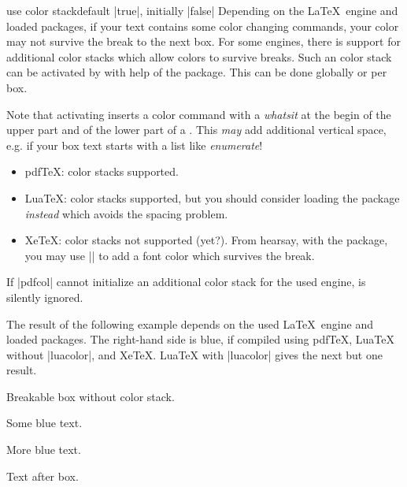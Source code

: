\begin{docTcbKey}[][doc new=2020-10-09]{use color stack}{}{default |true|, initially |false|}
  Depending on the \LaTeX\ engine and loaded packages, if your text contains some
  color changing commands, your color may not survive the break to the next box.
  For some engines, there is support for additional color stacks which
  allow colors to survive breaks. Such an color stack  can be activated
  by  with help of the  package.
  This can be done globally or per box.
  \begin{marker}
  Note that activating  inserts a color command with a \emph{whatsit}
  at the begin of the upper part and of the lower part of a .
  This \emph{may} add additional vertical space, e.g. if your box text starts
  with a list like \emph{enumerate}!
  \end{marker}
  \begin{itemize}
  \item pdf\TeX: color stacks supported.
  \item Lua\TeX: color stacks supported, but you should consider loading the
      package \emph{instead} which avoids the spacing problem.
  \item Xe\TeX: color stacks not supported (yet?). From hearsay,
    with the  package, you may use ||
    to add a font color which survives the break.
  \end{itemize}
  If |pdfcol| cannot initialize an additional color stack for the used engine,
   is silently ignored.

\clearpage
The result of the following example depends on the used  \LaTeX\ engine and
loaded packages. The right-hand side is blue, if compiled using
pdf\TeX, Lua\TeX{} without |luacolor|, and  Xe\TeX.
Lua\TeX{} with |luacolor| gives the next but one result.

\begin{dispExample}
\begin{multicols}{2}\footnotesize
Breakable box without color stack.
\begin{tcolorbox}[enhanced jigsaw,
  size=small, colframe=gray, colback=yellow!10!white, colupper=blue,
  enforce breakable,%
  vfill before first, pad at break=1mm, break at=33mm ]
    Some blue text.\par\smallskip
    {\color{red}\itshape\lipsum[2]}\par\smallskip
    More blue text.
\end{tcolorbox}
Text after box.
\end{multicols}
\end{dispExample}


\end{docTcbKey}
